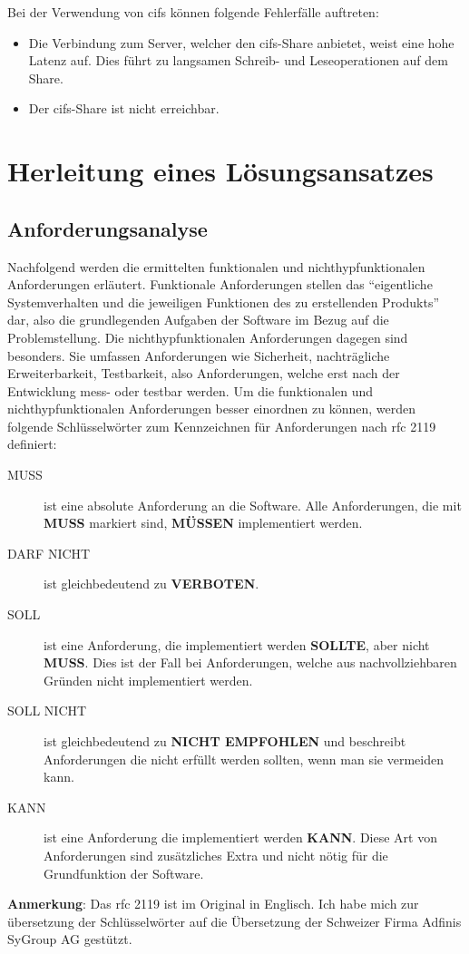 \documentclass[titlepage]{report}
\begin{document}
Bei der Verwendung von \gls{cifs} können folgende Fehlerfälle auftreten:
\begin{itemize}
    \item Die Verbindung zum Server, welcher den \gls{cifs}\hyp{}Share
          anbietet, weist eine hohe Latenz auf. Dies führt zu langsamen
          Schreib\hyp{} und Leseoperationen auf dem Share.
    \item Der \gls{cifs}\hyp{}Share ist nicht erreichbar.
\end{itemize}
\chapter*{Herleitung eines Lösungsansatzes}
\section*{Anforderungsanalyse}
Nachfolgend werden die ermittelten funktionalen und nichthyp{}funktionalen
Anforderungen erläutert. Funktionale Anforderungen stellen das
``eigentliche Systemverhalten und die jeweiligen Funktionen des zu
erstellenden Produkts''\cite[S. 20]{BPSE} dar, also die grundlegenden
Aufgaben der Software im Bezug auf die Problemstellung. Die
nichthyp{}funktionalen Anforderungen dagegen sind besonders. Sie umfassen
Anforderungen wie Sicherheit, nachträgliche Erweiterbarkeit,
Testbarkeit, also Anforderungen, welche erst nach der Entwicklung
mess\hyp{} oder testbar werden\cite[S. 292]{SNFA}. Um die funktionalen
und nichthyp{}funktionalen Anforderungen besser einordnen zu können, werden
folgende Schlüsselwörter zum Kennzeichnen für Anforderungen nach
\gls{rfc} 2119\cite{RFC2119} definiert:
\begin{description}
    \item[MUSS] ist eine absolute Anforderung an die Software. Alle
        Anforderungen, die mit \textbf{MUSS} markiert sind,
        \textbf{MÜSSEN} implementiert werden.
    \item[DARF NICHT] ist gleichbedeutend zu \textbf{VERBOTEN}.
    \item[SOLL] ist eine Anforderung, die implementiert werden
        \textbf{SOLLTE}, aber nicht \textbf{MUSS}. Dies ist der Fall bei
        Anforderungen, welche aus nachvollziehbaren Gründen nicht
        implementiert werden.
    \item[SOLL NICHT] ist gleichbedeutend zu \textbf{NICHT EMPFOHLEN}
        und beschreibt Anforderungen die nicht erfüllt werden sollten,
        wenn man sie vermeiden kann.
    \item[KANN] ist eine Anforderung die implementiert werden
        \textbf{KANN}. Diese Art von Anforderungen sind
        zusätzliches Extra und nicht nötig für die Grundfunktion der
        Software.
\end{description}
\textbf{Anmerkung}: Das \gls{rfc} 2119 ist im Original in Englisch. Ich
habe mich zur übersetzung der Schlüsselwörter auf die Übersetzung der
Schweizer Firma Adfinis SyGroup AG gestützt\cite{RFC2119DE}.
\end{document}
